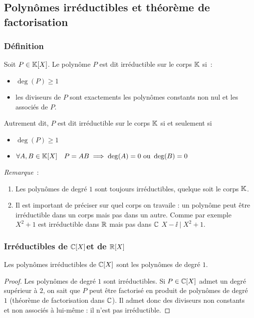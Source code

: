   \subsection{Polynômes irréductibles et théorème de factorisation}

  \subsubsection{Définition}

  \begin{defdef}
    Soit \(P \in \mathbb{K}[X]\). Le polynôme \(P\) est dit irréductible sur le corps \(\mathbb{K}\) si~:
    \begin{itemize}
      \item \(\deg(P) \geqslant 1\)
      \item les diviseurs de \(P\) sont exactements les polynômes constants non nul et les associés de \(P\).
    \end{itemize}
    Autrement dit, \(P\) est dit irréductible sur le corps \(\mathbb{K}\) si et seulement si
    \begin{itemize}
      \item \(\deg(P) \geqslant 1\)
      \item \(\forall A,B \in \mathbb{K}[X] \quad P=AB \implies \deg(A)=0 \text{~ou~} \deg(B)=0\)
    \end{itemize}
  \end{defdef}

  \emph{Remarque}~:
  \begin{enumerate}
    \item Les polynômes de degré \(1\) sont toujours irréductibles, quelque soit le corps \(\mathbb{K}\).
    \item Il est important de préciser sur quel corps on travaile : un polynôme peut être irréductible dans un corps mais pas dans un autre. Comme par exemple \(X^2+1\) est irréductible dans \(\mathbb{R}\) mais pas dans \(\mathbb{C}\) \(X-\ii\mid{}X^2+1\).
  \end{enumerate}

  \subsubsection{Irréductibles de \(\mathbb{C}[X]\)et de \(\mathbb{R}[X]\)}

  \begin{prop}
    Les polynômes irréductibles de \(\mathbb{C}[X]\) sont les polynômes de degré \(1\).
  \end{prop}
  \begin{proof}
    Les polynômes de degré \(1\) sont irréductibles. Si \(P\in \mathbb{C}[X]\) admet un degré supérieur à \(2\), on sait que \(P\) peut être factorisé en produit de polynômes de degré \(1\) (théorème de factorisation dans \(\mathbb{C}\)). Il admet donc des diviseurs non constants et non associés à lui-même : il n'est pas irréductible.
  \end{proof}

